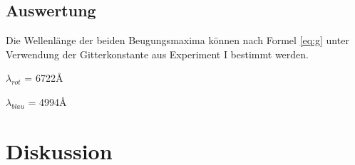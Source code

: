 \documentclass[12pt,a4paper]{article}
\begin{document}
\subsection*{Auswertung}
Die Wellenl\"ange der beiden Beugungsmaxima k\"onnen nach Formel \ref{eq:g} unter Verwendung der Gitterkonstante aus Experiment I bestimmt werden.\vspace{5pt}

$\lambda_{rot}$ = 6722\AA

$\lambda_{blau}$ = 4994\AA

\vspace{5pt}



\section*{Diskussion}
\end{document}
